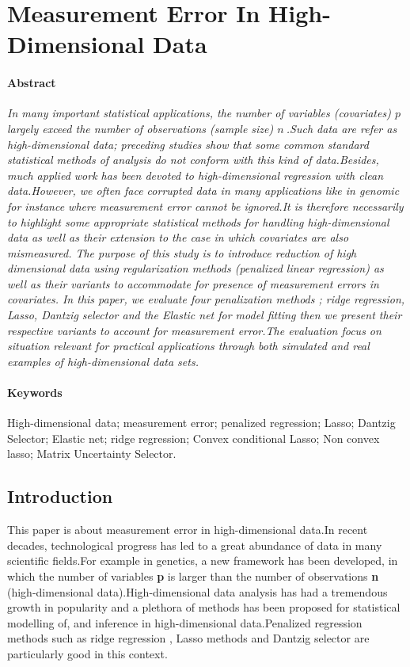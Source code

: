 \documentclass[12pt]{report}
\begin{document}
	
\chapter*{Measurement Error In High-Dimensional Data}
\subsubsection{Abstract}
	{\small \slshape In many important statistical applications, the number of variables (covariates) $p\ $ largely exceed the number of observations (sample size) $n\ $.Such data are refer as high-dimensional data; preceding studies show that some common standard statistical methods of analysis do not conform with this kind of data.Besides, much applied work has been devoted to high-dimensional regression with clean data.However, we often face corrupted data in many applications like in genomic for instance where measurement error cannot be ignored.It is therefore necessarily to highlight some appropriate statistical methods for handling high-dimensional data as well as their extension to the case in which covariates are also mismeasured. The purpose of this study is to introduce reduction of high dimensional data using regularization methods (penalized linear regression) as well as their variants to accommodate  for presence of measurement errors in covariates. In this paper, we evaluate four penalization methods ; ridge regression, Lasso, Dantzig selector and the Elastic net for model fitting then we present their respective variants to account for measurement error.The evaluation focus on situation relevant for practical applications through both simulated and real examples of high-dimensional data sets.}
\subsubsection{Keywords}
High-dimensional data; measurement error; penalized regression; Lasso; Dantzig Selector; Elastic net; ridge regression; Convex conditional Lasso; Non convex lasso; Matrix Uncertainty Selector.
\section{Introduction}

This paper is about measurement error in high-dimensional data.In recent decades, technological progress has led to a great abundance of data in many scientific fields.For example in genetics, a new framework has been developed, in which the number of variables \textbf{p} is larger than the number of observations \textbf{n} (high-dimensional data).High-dimensional data analysis has had a tremendous growth in popularity and a plethora of methods has been proposed for statistical modelling of, and inference in high-dimensional data.Penalized regression methods such as ridge regression \cite{nref8}, Lasso \cite{nref9} methods and Dantzig selector \cite{nref12} are particularly good in this context.
\end{document}
